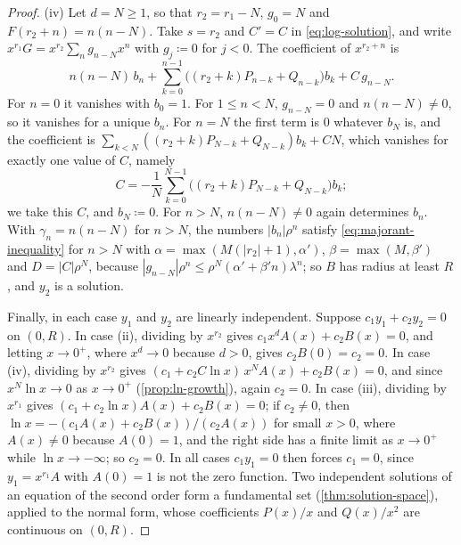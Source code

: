 \begin{proof}
(iv) Let $d=N\ge1$, so that $r_2=r_1-N$, $g_0=N$ and $F(r_2+n)=n(n-N)$. Take $s=r_2$ and $C'=C$ in \eqref{eq:log-solution}, and write $x^{r_1}G=x^{r_2}\sum_ng_{n-N}x^n$ with $g_j\coloneqq0$ for $j<0$. The coefficient of $x^{r_2+n}$ is
\[
n(n-N)\,b_n+\sum_{k=0}^{n-1}\bigl((r_2+k)P_{n-k}+Q_{n-k}\bigr)b_k+C\,g_{n-N}.
\]
For $n=0$ it vanishes with $b_0=1$. For $1\le n<N$, $g_{n-N}=0$ and $n(n-N)\ne0$, so it vanishes for a unique $b_n$. For $n=N$ the first term is $0$ whatever $b_N$ is, and the coefficient is $\sum_{k<N}((r_2+k)P_{N-k}+Q_{N-k})b_k+CN$, which vanishes for exactly one value of $C$, namely
\[
C=-\frac1N\sum_{k=0}^{N-1}\bigl((r_2+k)P_{N-k}+Q_{N-k}\bigr)b_k ;
\]
we take this $C$, and $b_N\coloneqq0$. For $n>N$, $n(n-N)\ne0$ again determines $b_n$. With $\gamma_n=n(n-N)$ for $n>N$, the numbers $|b_n|\rho^n$ satisfy \eqref{eq:majorant-inequality} for $n>N$ with $\alpha=\max(M(|r_2|+1),\alpha')$, $\beta=\max(M,\beta')$ and $D=|C|\rho^N$, because $|g_{n-N}|\rho^n\le\rho^N(\alpha'+\beta'n)\lambda^n$; so $B$ has radius at least $R$, and $y_2$ is a solution.

Finally, in each case $y_1$ and $y_2$ are linearly independent. Suppose $c_1y_1+c_2y_2=0$ on $(0,R)$. In case (ii), dividing by $x^{r_2}$ gives $c_1x^dA(x)+c_2B(x)=0$, and letting $x\to0^+$, where $x^d\to0$ because $d>0$, gives $c_2B(0)=c_2=0$. In case (iv), dividing by $x^{r_2}$ gives $(c_1+c_2C\ln x)\,x^NA(x)+c_2B(x)=0$, and since $x^N\ln x\to0$ as $x\to0^+$ (\cref{prop:ln-growth}), again $c_2=0$. In case (iii), dividing by $x^{r_1}$ gives $(c_1+c_2\ln x)A(x)+c_2B(x)=0$; if $c_2\ne0$, then $\ln x=-(c_1A(x)+c_2B(x))/(c_2A(x))$ for small $x>0$, where $A(x)\ne0$ because $A(0)=1$, and the right side has a finite limit as $x\to0^+$ while $\ln x\to-\infty$; so $c_2=0$. In all cases $c_1y_1=0$ then forces $c_1=0$, since $y_1=x^{r_1}A$ with $A(0)=1$ is not the zero function. Two independent solutions of an equation of the second order form a fundamental set (\cref{thm:solution-space}), applied to the normal form, whose coefficients $P(x)/x$ and $Q(x)/x^2$ are continuous on $(0,R)$.
\end{proof}


